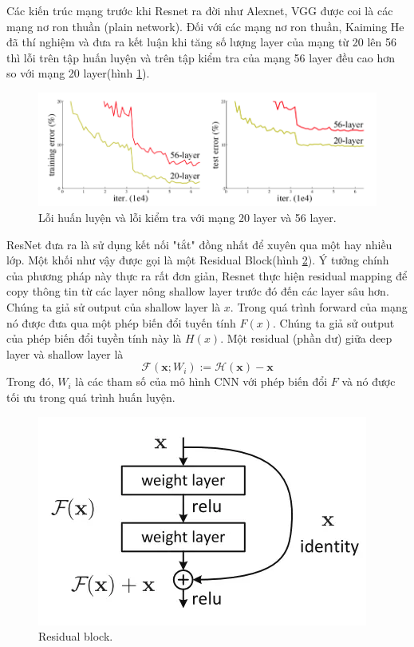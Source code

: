 Các kiến trúc mạng trước khi Resnet ra đời như Alexnet, VGG được coi là các mạng nơ ron thuần (plain network). Đối với các mạng nơ ron thuần, Kaiming He\cite{resnet} đã thí nghiệm và đưa ra kết luận khi tăng số lượng layer của mạng từ 20 lên 56 thì lỗi trên tập huấn luyện và trên tập kiểm tra của mạng 56 layer đều cao hơn so với mạng 20 layer(hình \ref{fig:resnet_vanishing_gradient}). 
\begin{figure}[H]
	\centering
	\includegraphics[width=1\linewidth]{images/resnet_vanishing_gradient}
	\caption{Lỗi huấn luyện và lỗi kiểm tra với mạng 20 layer và 56 layer.}
	\label{fig:resnet_vanishing_gradient}
\end{figure} 
ResNet đưa ra là sử dụng kết nối "tắt" đồng nhất để xuyên qua một hay nhiều lớp. Một khối như vậy được gọi là một Residual Block(hình \ref{fig:resnet_residual_block}). Ý tưởng chính của phương pháp này thực ra rất đơn giản, Resnet thực hiện residual mapping để copy thông tin từ các layer nông shallow layer trước đó đến các layer sâu hơn. Chúng ta giả sử output của shallow layer là $x$. Trong quá trình forward của mạng nó được đưa qua một phép biến đổi tuyến tính $F(x)$. Chúng ta giả sử output của phép biến đổi tuyền tính này là $H(x)$. Một residual (phần dư) giữa deep layer và shallow layer là
$$\mathcal{F}(\mathbf{x}; W_i) := \mathcal{H}(\mathbf{x}) - \mathbf{x}$$
Trong đó, $W_i$ là các tham số của mô hình CNN với phép biến đổi $F$ và nó được tối ưu trong quá trình huấn luyện.
\begin{figure}[H]
	\centering
	\includegraphics[width=0.5\linewidth]{images/resnet_residual_block}
	\caption{Residual block.}
	\label{fig:resnet_residual_block}
\end{figure}
